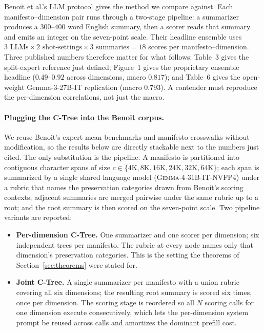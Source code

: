 Benoit et al.'s LLM protocol gives the method we compare against. Each
manifesto--dimension pair runs through a two-stage pipeline: a summarizer
produces a $300$--$400$ word English summary, then a scorer reads that
summary and emits an integer on the seven-point scale. Their headline
ensemble uses
$3 \text{ LLMs} \times 2 \text{ shot-settings} \times 3 \text{ summaries}
= 18$ scores per manifesto--dimension. Three published numbers therefore
matter for what follows: Table~3 gives the split-expert reference just
defined; Figure~1 gives the proprietary ensemble headline ($0.49$--$0.92$
across dimensions, macro $0.817$); and Table~6 gives the open-weight
Gemma-3-27B-IT replication (macro $0.793$). A contender must reproduce
the per-dimension correlations, not just the macro.

\paragraph{Plugging the C-Tree into the Benoit corpus.} We reuse
Benoit's expert-mean benchmarks and manifesto crosswalks
without modification, so the results below are directly stackable next
to the numbers just cited. The only substitution is the pipeline. A
manifesto is partitioned into contiguous character spans of size
$c\in\{4\mathrm{K},8\mathrm{K},16\mathrm{K},24\mathrm{K},32\mathrm{K},64\mathrm{K}\}$;
each span is summarized by a single shared language model
(\textsc{Gemma-4-31B-IT-NVFP4}) under a rubric that names the
preservation categories drawn from Benoit's scoring contexts; adjacent
summaries are merged pairwise under the same rubric up to a root;
and the root summary is then scored on the seven-point scale. Two
pipeline variants are reported:

\begin{itemize}[leftmargin=1.5em]
    \item \textbf{Per-dimension C-Tree.} One summarizer and one scorer
          per dimension; six independent trees per manifesto. The
          rubric at every node names only that dimension's preservation
          categories. This is the setting the theorems of
          Section~\ref{sec:theorems} were stated for.
    \item \textbf{Joint C-Tree.} A single summarizer per manifesto
          with a union rubric covering all six dimensions; the
          resulting root summary is scored six times, once per
          dimension. The scoring stage is reordered so all $N$
          scoring calls for one dimension execute consecutively,
          which lets the per-dimension system prompt be reused across
          calls and amortizes the dominant prefill cost.
\end{itemize}

